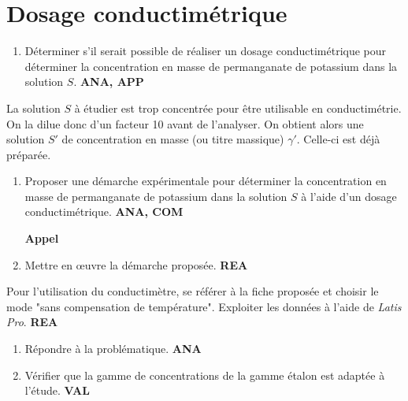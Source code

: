 \documentclass[a4paper,11pt,fleqn]{article}%
\begin{document}
\section*{Dosage conductimétrique}
	\begin{enumerate}
	\item Déterminer s'il serait possible de réaliser un dosage conductimétrique pour déterminer la concentration en masse de permanganate de potassium dans la solution $S$. \textcolor{gray!80!blue}{\textbf{ANA, APP}}\\
	\end{enumerate}
La solution $S$ à étudier est trop concentrée pour être utilisable en conductimétrie. On la dilue donc d'un facteur 10 avant de l'analyser. On obtient alors une solution $S'$ de concentration en masse (ou titre massique) $\gamma '$. Celle-ci est déjà préparée.

	\begin{enumerate}[resume]
	\item Proposer une démarche expérimentale pour déterminer la concentration en masse de permanganate de potassium dans la solution $S$ à l'aide d'un dosage conductimétrique. \textcolor{gray!80!blue}{\textbf{ANA, COM}}\\
	\begin{center}
	\textbf{Appel}
	\end{center}
	\item Mettre en œuvre la démarche proposée. \textcolor{gray!80!blue}{\textbf{REA}}\\
	\end{enumerate}

	Pour l'utilisation du conductimètre, se référer à la fiche proposée et choisir le mode "sans compensation de température". Exploiter les données à l'aide de \textit{Latis Pro}. \textcolor{gray!80!blue}{\textbf{REA}}

	\begin{enumerate}[resume]
	\item Répondre à la problématique. \textcolor{gray!80!blue}{\textbf{ANA}}
	\item Vérifier que la gamme de concentrations de la gamme étalon est adaptée à l'étude. \textcolor{gray!80!blue}{\textbf{VAL}}
	\end{enumerate}
\end{document}
